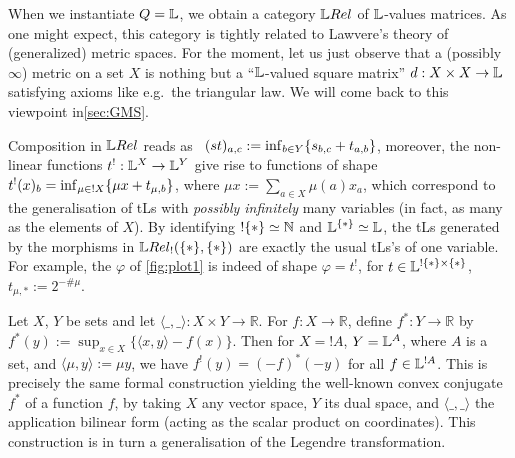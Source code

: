 
When we instantiate $Q=\mathbb{L}$, we obtain a category $\LREL$ of $\mathbb{L}$-values matrices. As one might expect, this category is tightly related to Lawvere's theory of (generalized) metric spaces. For the moment, let us just observe that a (possibly $\infty$) metric on a set $X$ is nothing but a ``$\mathbb{L}$-valued square matrix'' $d:X\times X\to \mathbb{L}$ satisfying axioms like e.g.~the triangular law.
We will come back to this viewpoint in\autoref{sec:GMS}.

Composition in $\LREL$ %
reads as \ $(st)_{a,c}:=\inf_{b\in Y}\{s_{b,c}+t_{a,b}\}$, moreover, the non-linear functions $t^{!}: \mathbb{L}^{X}\to \mathbb{L}^{Y}$ give rise to functions of shape 
$t^!(x)_b=\inf_{\mu\in !X} \{\mu x+ t_{\mu,b}\}$, where $\mu x:=\sum_{a\in X} \mu(a)x_a$, which correspond to the generalisation of tLs with \emph{possibly infinitely} many variables (in fact, as many as the elements of $X$).
By identifying $!\{*\}\simeq \mathbb{N}$ and $\mathbb{L}^{\{*\}}\simeq\mathbb{L}$, the tLs generated by the morphisms in $\HOM{\LREL_!}{\set{*}}{\set{*}}$ are exactly the %
usual tLs's of one variable. %
For example, the $\varphi$ of \autoref{fig:plot1} is indeed of shape $\varphi=t^!$, for $t\in\mathbb{L}^{!\{*\}\times\{*\}}$, $t_{\mu,*}:=2^{-\# \mu}$.

\begin{remark}
 Let $X$, $Y$ be sets and let $\langle \_,\_\rangle:X\times Y \to \mathbb{R}$.
 For $f:X\to \mathbb R$, define $f^*:Y\to \mathbb R$ by $f^*(y):= \sup_{x\in X}\{\langle x,y\rangle - f(x)\}$.
 Then for $X=!A$, $Y=\mathbb{L}^A$, where $A$ is a set, and $\langle \mu, y \rangle:= \mu y$, we have $f^!(y)=(-f)^*(-y)$ for all $f\in\mathbb{L}^{!A}$.
 This is precisely the same formal construction yielding the well-known convex conjugate $f^*$ of a function $f$, by taking $X$ any vector space, $Y$ its dual space, and $\langle \_,\_\rangle$ the application bilinear form (acting as the scalar product on coordinates).
 This construction is in turn a generalisation of the Legendre transformation.
\end{remark}

